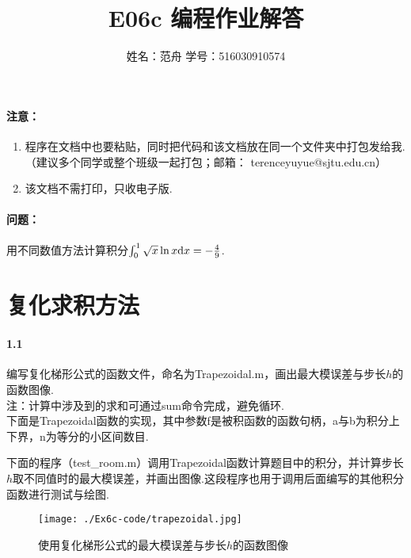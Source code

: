 

\title{E06c 编程作业解答}
\author{姓名：范舟 \quad 学号：516030910574}
\date{}


\maketitle

\paragraph{注意：} 
\begin{enumerate}
\item 程序在文档中也要粘贴，同时把代码和该文档放在同一个文件夹中打包发给我.（建议多个同学或整个班级一起打包；邮箱： terenceyuyue@sjtu.edu.cn）
\item 该文档不需打印，只收电子版.
\end{enumerate}

\paragraph{问题：} 用不同数值方法计算积分$\int_{0}^{1} \sqrt{x} \ln{x} \mathrm{d} x = -\frac{4}{9}$.

\section{复化求积方法}
\paragraph{1.1} 编写复化梯形公式的函数文件，命名为Trapezoidal.m，画出最大模误差与步长$h$的函数图像.\\
注：计算中涉及到的求和可通过sum命令完成，避免循环.\\
下面是Trapezoidal函数的实现，其中参数f是被积函数的函数句柄，a与b为积分上下界，n为等分的小区间数目.

下面的程序（test\_room.m）调用Trapezoidal函数计算题目中的积分，并计算步长$h$取不同值时的最大模误差，并画出图像.这段程序也用于调用后面编写的其他积分函数进行测试与绘图.

\begin{figure}[H]
  \begin{center}
    \texttt{[image: ./Ex6c-code/trapezoidal.jpg]}
    \caption{使用复化梯形公式的最大模误差与步长$h$的函数图像}
  \end{center}
\end{figure}
